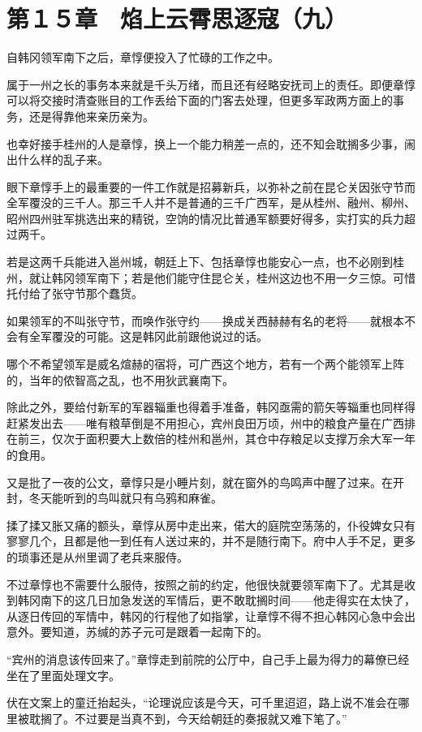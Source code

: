 \section{第１５章　焰上云霄思逐寇（九）}

自韩冈领军南下之后，章惇便投入了忙碌的工作之中。

属于一州之长的事务本来就是千头万绪，而且还有经略安抚司上的责任。即便章惇可以将交接时清查账目的工作丢给下面的门客去处理，但更多军政两方面上的事务，还是得靠他来亲历亲为。

也幸好接手桂州的人是章惇，换上一个能力稍差一点的，还不知会耽搁多少事，闹出什么样的乱子来。

眼下章惇手上的最重要的一件工作就是招募新兵，以弥补之前在昆仑关因张守节而全军覆没的三千人。那三千人并不是普通的三千广西军，是从桂州、融州、柳州、昭州四州驻军挑选出来的精锐，空饷的情况比普通军额要好得多，实打实的兵力超过两千。

若是这两千兵能进入邕州城，朝廷上下、包括章惇也能安心一点，也不必刚到桂州，就让韩冈领军南下；若是他们能守住昆仑关，桂州这边也不用一夕三惊。可惜托付给了张守节那个蠢货。

如果领军的不叫张守节，而唤作张守约——换成关西赫赫有名的老将——就根本不会有全军覆没的可能。这是韩冈此前跟他说过的话。

哪个不希望领军是威名煊赫的宿将，可广西这个地方，若有一个两个能领军上阵的，当年的侬智高之乱，也不用狄武襄南下。

除此之外，要给付新军的军器辎重也得着手准备，韩冈亟需的箭矢等辎重也同样得赶紧发出去——唯有粮草倒是不用担心，宾州良田万顷，州中的粮食产量在广西排在前三，仅次于面积要大上数倍的桂州和邕州，其仓中存粮足以支撑万余大军一年的食用。

又是批了一夜的公文，章惇只是小睡片刻，就在窗外的鸟鸣声中醒了过来。在开封，冬天能听到的鸟叫就只有乌鸦和麻雀。

揉了揉又胀又痛的额头，章惇从房中走出来，偌大的庭院空荡荡的，仆役婢女只有寥寥几个，且都是他一到任有人送过来的，并不是随行南下。府中人手不足，更多的琐事还是从州里调了老兵来服侍。

不过章惇也不需要什么服侍，按照之前的约定，他很快就要领军南下了。尤其是收到韩冈南下的这几日加急发送的军情后，更不敢耽搁时间——他走得实在太快了，从逐日传回的军情中，韩冈的行程他了如指掌，让章惇不得不担心韩冈心急中会出意外。要知道，苏缄的苏子元可是跟着一起南下的。

“宾州的消息该传回来了。”章惇走到前院的公厅中，自己手上最为得力的幕僚已经坐在了里面处理文字。

伏在文案上的童迁抬起头，“论理说应该是今天，可千里迢迢，路上说不准会在哪里被耽搁了。不过要是当真不到，今天给朝廷的奏报就又难下笔了。”

